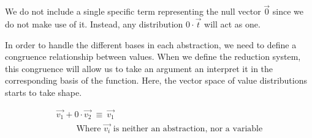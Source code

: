 \begin{remark}
  We do not include a single specific term representing the null vector $\vec{0}$ since we do not make use of it. Instead, any distribution $0\cdot\vec{t}$ will act as one. 
\end{remark}

In order to handle the different bases in each abstraction, we need to define a congruence relationship between values. When we define the reduction system, this congruence will allow us to take an argument an interpret it in the corresponding basis of the function. Here, the vector space of value distributions starts to take shape.

\begin{table*}[tb]
  \small
  \vspace*{0.2cm}
  \[
    \begin{array}{l}
      \vec{v_1} + 0\cdot \vec{v_2}~\equiv~\vec{v_1}\\  
      \qquad\text{ Where $\vec{v_i}$ is neither an abstraction, nor a variable}
    \end{array}   
  \]
  

\end{table*}
